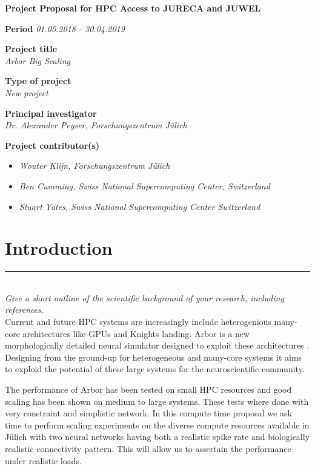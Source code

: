 \documentclass [a4paper, 12pt]{article}
\newcommand{\julich}{J\"ulich\xspace}
\begin{document}
\begin{center}
{\LARGE \bf Project Proposal for HPC Access to JURECA and JUWEL} 

\bigskip
\bigskip
\bigskip
\end{center}
\textbf{Period}
\phantom{MM}\textit{01.05.2018 - 30.04.2019 }

\bigskip
\textbf{Project title}\\
\phantom{MM}\textit{Arbor Big Scaling}

\bigskip
\textbf{Type of project}\\
\phantom{MM} \textit{New project}

\bigskip
\textbf{Principal investigator}\\
\phantom{MM} \textit{Dr. Alexander Peyser, Forschungszentrum \julich }

\bigskip
\textbf{Project contributor(s)}\\

\begin{itemize}
\item \phantom{MM} \textit{Wouter Klijn, Forschungszentrum \julich }
\item \phantom{MM} \textit{Ben Cumming, Swiss National Supercomputing Center, Switzerland}
\item \phantom{MM} \textit{Stuart Yates, Swiss National Supercomputing Center Switzerland}
\end{itemize}

\newpage

\vfill
\tableofcontents
\vfill

\newpage



\section{Introduction}
\rule{\textwidth}{0.4pt}\\

\textit{Give a short outline of the scientific background of your research, including references.}\\
Current and future HPC systems are increasingly include heterogenious many-core architectures like GPUs and Knights landing. Arbor is a new morphologically detailed neural simulator designed to exploit these architectures . Designing  from the ground-up for heterogeneous and many-core systems it aims to exploid the potential of these large systems for the neuroscientific community. 

The performance of Arbor has been tested on small HPC resources and good scaling has been shown on medium to large systems. These tests where done with very constraint and simplistic network. In this compute time proposal we ask time to perform scaling experiments on the diverse compute resources available in \julich with two neural networks having both a realistic spike rate and biologically realistic connectivity pattern. This will allow us to assertain the performance under realistic loads.
\end{document}

